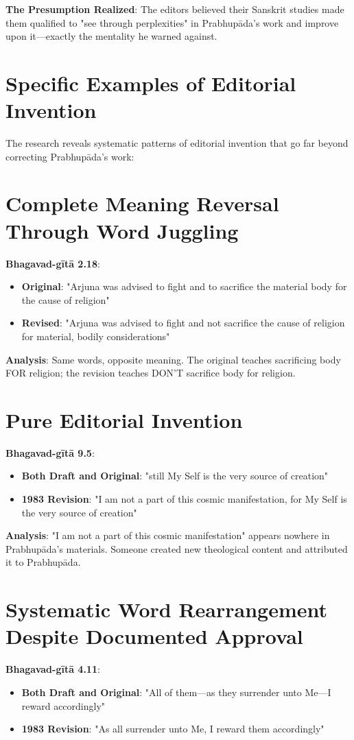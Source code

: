 \documentclass[11pt,twoside]{book}
\begin{document}
\textbf{\textbf{The Presumption Realized}}: The editors believed their Sanskrit studies made them qualified to "see through perplexities" in Prabhupāda's work and improve upon it—exactly the mentality he warned against.
\section*{Specific Examples of Editorial Invention}
\label{sec:orgba6fcfb}

The research reveals systematic patterns of editorial invention that go far beyond correcting Prabhupāda's work:
\section*{Complete Meaning Reversal Through Word Juggling}
\label{sec:org9928488}
\textbf{\textbf{Bhagavad-gītā 2.18}}:
\begin{itemize}
\item \textbf{\textbf{Original}}: "Arjuna was advised to fight and to sacrifice the material body for the cause of religion"
\item \textbf{\textbf{Revised}}: "Arjuna was advised to fight and not sacrifice the cause of religion for material, bodily considerations"
\end{itemize}

\textbf{\textbf{Analysis}}: Same words, opposite meaning. The original teaches sacrificing body FOR religion; the revision teaches DON'T sacrifice body for religion.
\section*{Pure Editorial Invention}
\label{sec:org3816166}
\textbf{\textbf{Bhagavad-gītā 9.5}}:
\begin{itemize}
\item \textbf{\textbf{Both Draft and Original}}: "still My Self is the very source of creation"
\item \textbf{\textbf{1983 Revision}}: "I am not a part of this cosmic manifestation, for My Self is the very source of creation"
\end{itemize}

\textbf{\textbf{Analysis}}: "I am not a part of this cosmic manifestation" appears nowhere in Prabhupāda's materials. Someone created new theological content and attributed it to Prabhupāda.
\section*{Systematic Word Rearrangement Despite Documented Approval}
\label{sec:org91bfd3b}
\textbf{\textbf{Bhagavad-gītā 4.11}}:
\begin{itemize}
\item \textbf{\textbf{Both Draft and Original}}: "All of them—as they surrender unto Me—I reward accordingly"
\item \textbf{\textbf{1983 Revision}}: "As all surrender unto Me, I reward them accordingly"
\end{itemize}
\end{document}
